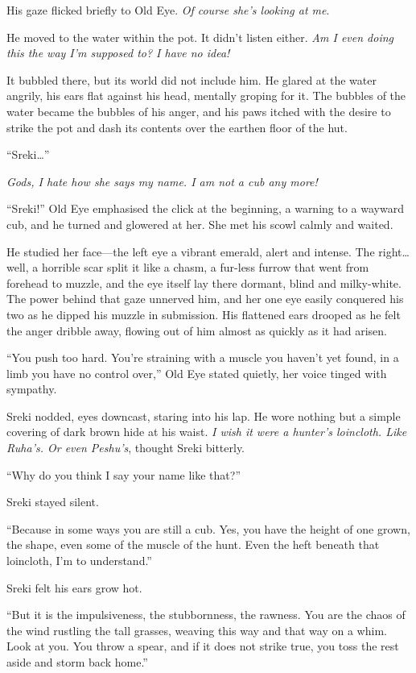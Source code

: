 His gaze flicked briefly to Old Eye. \emph{Of course she's looking at me}.

He moved to the water within the pot. It didn't listen either. \emph{Am I even doing this the way I'm supposed to? I have no idea!}

It bubbled there, but its world did not include him. He glared at the water angrily, his ears flat against his head, mentally groping for it. The bubbles of the water became the bubbles of his anger, and his paws itched with the desire to strike the pot and dash its contents over the earthen floor of the hut.

``Sreki\ldots''

\emph{Gods, I hate how she says my name. I am not a cub any more!}

``Sreki!'' Old Eye emphasised the click at the beginning, a warning to a wayward cub, and he turned and glowered at her. She met his scowl calmly and waited.

He studied her face---the left eye a vibrant emerald, alert and intense. The right\ldots{}well, a horrible scar split it like a chasm, a fur-less furrow that went from forehead to muzzle, and the eye itself lay there dormant, blind and milky-white. The power behind that gaze unnerved him, and her one eye easily conquered his two as he dipped his muzzle in submission. His flattened ears drooped as he felt the anger dribble away, flowing out of him almost as quickly as it had arisen.

``You push too hard. You're straining with a muscle you haven't yet found, in a limb you have no control over,'' Old Eye stated quietly, her voice tinged with sympathy.

Sreki nodded, eyes downcast, staring into his lap. He wore nothing but a simple covering of dark brown hide at his waist. \emph{I wish it were a hunter's loincloth. Like Ruha's. Or even Peshu's}, thought Sreki bitterly.

``Why do you think I say your name like that?''

Sreki stayed silent.

``Because in some ways you are still a cub. Yes, you have the height of one grown, the shape, even some of the muscle of the hunt. Even the heft beneath that loincloth, I'm to understand.''

Sreki felt his ears grow hot.

``But it is the impulsiveness, the stubbornness, the rawness. You are the chaos of the wind rustling the tall grasses, weaving this way and that way on a whim. Look at you. You throw a spear, and if it does not strike true, you toss the rest aside and storm back home.''

